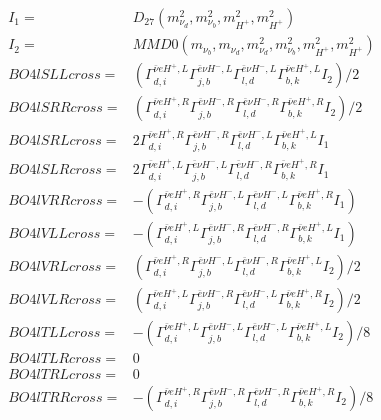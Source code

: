 \documentclass[A4,landscape]{article}
\begin{document}
\begin{align} 
I_1 = & D_{27}(m^2_{\nu_{{d}}}, m^2_{\nu_{{b}}}, m^2_{H^+}, m^2_{H^+}) \\ 
I_2 = & MMD0(m_{\nu_{{b}}}, m_{\nu_{{d}}}, m^2_{\nu_{{d}}}, m^2_{\nu_{{b}}}, m^2_{H^+}, m^2_{H^+}) \\ 
  BO4lSLLcross= & ( \Gamma^{\bar{\nu}e H^+ ,L}_{d, i} \Gamma^{\bar{e}\nu H^-,L}_{j, b} \Gamma^{\bar{e}\nu H^-,L}_{l, d} \Gamma^{\bar{\nu}e H^+ ,L}_{b, k} I_2)/2 \\ 
  BO4lSRRcross= & ( \Gamma^{\bar{\nu}e H^+ ,R}_{d, i} \Gamma^{\bar{e}\nu H^-,R}_{j, b} \Gamma^{\bar{e}\nu H^-,R}_{l, d} \Gamma^{\bar{\nu}e H^+ ,R}_{b, k} I_2)/2 \\ 
  BO4lSRLcross= & 2  \Gamma^{\bar{\nu}e H^+ ,R}_{d, i} \Gamma^{\bar{e}\nu H^-,R}_{j, b} \Gamma^{\bar{e}\nu H^-,L}_{l, d} \Gamma^{\bar{\nu}e H^+ ,L}_{b, k} I_1 \\ 
  BO4lSLRcross= & 2  \Gamma^{\bar{\nu}e H^+ ,L}_{d, i} \Gamma^{\bar{e}\nu H^-,L}_{j, b} \Gamma^{\bar{e}\nu H^-,R}_{l, d} \Gamma^{\bar{\nu}e H^+ ,R}_{b, k} I_1 \\ 
  BO4lVRRcross= & -( \Gamma^{\bar{\nu}e H^+ ,R}_{d, i} \Gamma^{\bar{e}\nu H^-,L}_{j, b} \Gamma^{\bar{e}\nu H^-,L}_{l, d} \Gamma^{\bar{\nu}e H^+ ,R}_{b, k} I_1) \\ 
  BO4lVLLcross= & -( \Gamma^{\bar{\nu}e H^+ ,L}_{d, i} \Gamma^{\bar{e}\nu H^-,R}_{j, b} \Gamma^{\bar{e}\nu H^-,R}_{l, d} \Gamma^{\bar{\nu}e H^+ ,L}_{b, k} I_1) \\ 
  BO4lVRLcross= & ( \Gamma^{\bar{\nu}e H^+ ,R}_{d, i} \Gamma^{\bar{e}\nu H^-,L}_{j, b} \Gamma^{\bar{e}\nu H^-,R}_{l, d} \Gamma^{\bar{\nu}e H^+ ,L}_{b, k} I_2)/2 \\ 
  BO4lVLRcross= & ( \Gamma^{\bar{\nu}e H^+ ,L}_{d, i} \Gamma^{\bar{e}\nu H^-,R}_{j, b} \Gamma^{\bar{e}\nu H^-,L}_{l, d} \Gamma^{\bar{\nu}e H^+ ,R}_{b, k} I_2)/2 \\ 
  BO4lTLLcross= & -( \Gamma^{\bar{\nu}e H^+ ,L}_{d, i} \Gamma^{\bar{e}\nu H^-,L}_{j, b} \Gamma^{\bar{e}\nu H^-,L}_{l, d} \Gamma^{\bar{\nu}e H^+ ,L}_{b, k} I_2)/8 \\ 
  BO4lTLRcross= & 0 \\ 
  BO4lTRLcross= & 0 \\ 
  BO4lTRRcross= & -( \Gamma^{\bar{\nu}e H^+ ,R}_{d, i} \Gamma^{\bar{e}\nu H^-,R}_{j, b} \Gamma^{\bar{e}\nu H^-,R}_{l, d} \Gamma^{\bar{\nu}e H^+ ,R}_{b, k} I_2)/8 \\ 
\end{align} 
\end{document}
